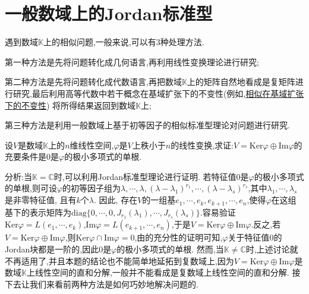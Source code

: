 \documentclass[../../main.tex]{subfiles}%
\begin{document}
\section{一般数域上的Jordan标准型}

遇到数域$\mathbb{K}$上的相似问题,一般来说,可以有3种处理方法. 

第一种方法是先将问题转化成几何语言,再利用线性变换理论进行研究;

第二种方法是先将问题转化成代数语言,再把数域$\mathbb{K}$上的矩阵自然地看成是复矩阵进行研究,最后利用高等代数中若干概念在基域扩张下的不变性(例如,\hyperref[corollary:矩阵的相似关系在基域扩张下不变]{相似在基域扩张下的不变性}) 将所得结果返回到数域$\mathbb{K}$上;

第三种方法是利用一般数域上基于初等因子的相似标准型理论对问题进行研究. 

\begin{proposition}\label{proposition:数域K上关于核与值域的直和分解的充要条件}
设$V$是数域$\mathbb{K}$上的$n$维线性空间,$\varphi$是$V$上秩小于$n$的线性变换,求证:$V=\mathrm{Ker}\varphi\oplus\mathrm{Im}\varphi$的充要条件是$0$是$\varphi$的极小多项式的单根.
\end{proposition}
\begin{note}
分析:当$\mathbb{K}=\mathbb{C}$时,可以利用Jordan标准型理论进行证明. 若特征值$0$是$\varphi$的极小多项式的单根,则可设$\varphi$的初等因子组为$\lambda,\cdots,\lambda,(\lambda - \lambda_1)^{r_1},\cdots,(\lambda - \lambda_s)^{r_s}$,其中$\lambda_1,\cdots,\lambda_s$是非零特征值, 且有$k$个$\lambda$. 因此, 存在$V$的一组基$e_1,\cdots,e_k,e_{k + 1},\cdots,e_n$,使得$\varphi$在这组基下的表示矩阵为$\mathrm{diag}\{0,\cdots,0,J_{r_1}(\lambda_1),\cdots,J_{r_s}(\lambda_s)\}$.容易验证$\mathrm{Ker}\varphi = L(e_1,\cdots,e_k)$,$\mathrm{Im}\varphi = L(e_{k + 1},\cdots,e_n)$,于是$V=\mathrm{Ker}\varphi\oplus\mathrm{Im}\varphi$.反之,若$V=\mathrm{Ker}\varphi\oplus\mathrm{Im}\varphi$,则$\mathrm{Ker}\varphi\cap\mathrm{Im}\varphi = 0$,由的充分性的证明可知,$\varphi$关于特征值$0$的Jordan块都是一阶的,因此$0$是$\varphi$的极小多项式的单根. 然而,当$\mathbb{K}\neq\mathbb{C}$时,上述讨论就不再适用了,并且本题的结论也不能简单地延拓到复数域上,因为$V=\mathrm{Ker}\varphi\oplus\mathrm{Im}\varphi$是数域$\mathbb{K}$上线性空间的直和分解,一般并不能看成是复数域上线性空间的直和分解. 接下去让我们来看前两种方法是如何巧妙地解决问题的.
\end{note}
\end{document}
